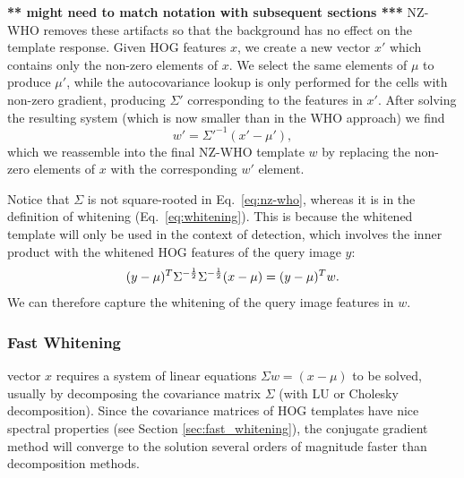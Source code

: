 \documentclass[10pt,twocolumn,letterpaper]{article}
\newcommand{\scream}[1]{{\color{red} \bf *** #1 ***}}
\begin{document}
\scream{might need to match notation with subsequent sections}
NZ-WHO removes these artifacts so that the background has no effect on the template response. Given HOG features $x$, we create a new vector $x'$ which contains only the non-zero elements of $x$. We select the same elements of $\mu$ to produce $\mu'$, while the autocovariance lookup is only performed for the cells with non-zero gradient, producing $\Sigma'$ corresponding to the features in $x'$. After solving the resulting system (which is now smaller than in the WHO approach) we find
\begin{equation}
w'=\Sigma'^{-1}(x' - \mu') \label{eq:nz-who},
\end{equation}which we reassemble into the final NZ-WHO template $w$ by replacing the non-zero elements of $x$ with the corresponding $w'$ element.

Notice that $\Sigma$ is not square-rooted in Eq.~\ref{eq:nz-who}, whereas it is in the definition of whitening (Eq.~\ref{eq:whitening}). This is because the whitened template will only be used in the context of detection, which involves the inner product with the whitened HOG features of the query image $y$:
\begin{equation}
(y-\mu)^{T}\Sigma^{-\frac{1}{2}}\Sigma^{-\frac{1}{2}}(x-\mu)\\
= (y-\mu)^{T} w.
\end{equation}
We can therefore capture the whitening of the query image features in $w$.




\subsubsection{Fast Whitening}

vector $x$ requires a system of linear equations $\Sigma w = (x - \mu)$ to be
solved, usually by decomposing the covariance matrix $\Sigma$ (with LU or
Cholesky decomposition). Since the covariance matrices of HOG templates have
nice spectral properties (see Section \ref{sec:fast_whitening}), the conjugate
gradient method will converge to the solution several orders of magnitude
faster than decomposition methods.
\end{document}
